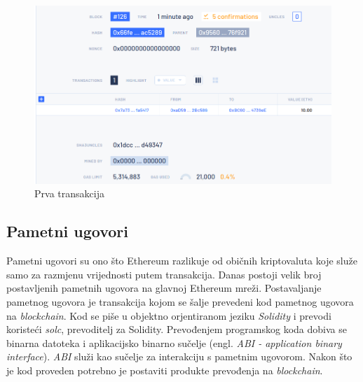 \documentclass[times, utf8, zavrsni, numeric]{fer}
\begin{document}
\pagebreak

\begin{figure}[ht]
  \includegraphics[width=\textwidth]{blocktx.png}
  \caption{Prva transakcija}
  \centering
  \vfill
\end{figure}

\subsection{Pametni ugovori}
Pametni ugovori su ono što Ethereum razlikuje od običnih kriptovaluta koje služe samo za razmjenu vrijednosti putem transakcija. Danas postoji velik broj postavljenih 
pametnih ugovora na glavnoj Ethereum mreži. Postavaljanje pametnog ugovora je transakcija kojom se šalje prevedeni kod pametnog ugovora na \emph{blockchain}.
Kod se piše u objektno orjentiranom jeziku \emph{Solidity} i prevodi koristeći \emph{solc}, prevoditelj za Solidity. Prevođenjem programskog koda dobiva se binarna datoteka
i aplikacijsko binarno sučelje (engl. \emph{ABI - application binary interface}). \emph{ABI} služi kao sučelje za interakciju s pametnim ugovorom. Nakon što je kod
proveden potrebno je postaviti produkte prevođenja na \emph{blockchain}.
\end{document}

